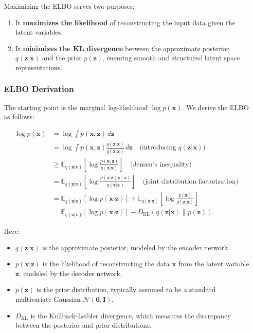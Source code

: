 \documentclass[a4paper,12pt]{article}
\begin{document}
Maximizing the ELBO serves two purposes:
\begin{enumerate}
    \item It \textbf{maximizes the likelihood} of reconstructing the input data given the latent variables.
    \item It \textbf{minimizes the KL divergence} between the approximate posterior $q(\mathbf{z}|\mathbf{x})$ and the prior $p(\mathbf{z})$, ensuring smooth and structured latent space representations.
\end{enumerate}

\subsubsection{ELBO Derivation}
The starting point is the marginal log-likelihood $\log p(\mathbf{x})$. We derive the ELBO as follows:

\begin{align*}
\log p(\mathbf{x}) 
&= \log \int p(\mathbf{x}, \mathbf{z}) \, d\mathbf{z} \\
&= \log \int p(\mathbf{x}, \mathbf{z}) \frac{q(\mathbf{z}|\mathbf{x})}{q(\mathbf{z}|\mathbf{x})} \, d\mathbf{z} \quad \text{(introducing $q(\mathbf{z}|\mathbf{x})$)} \\
&\geq \mathbb{E}_{q(\mathbf{z}|\mathbf{x})} \left[ \log \frac{p(\mathbf{x}, \mathbf{z})}{q(\mathbf{z}|\mathbf{x})} \right] \quad \text{(Jensen's inequality)} \\
&= \mathbb{E}_{q(\mathbf{z}|\mathbf{x})} \left[ \log \frac{p(\mathbf{x}|\mathbf{z}) p(\mathbf{z})}{q(\mathbf{z}|\mathbf{x})} \right] \quad \text{(joint distribution factorization)} \\
&= \mathbb{E}_{q(\mathbf{z}|\mathbf{x})} \left[ \log p(\mathbf{x}|\mathbf{z}) \right] 
+ \mathbb{E}_{q(\mathbf{z}|\mathbf{x})} \left[ \log \frac{p(\mathbf{z})}{q(\mathbf{z}|\mathbf{x})} \right] \\
&= \mathbb{E}_{q(\mathbf{z}|\mathbf{x})} \left[ \log p(\mathbf{x}|\mathbf{z}) \right] 
- D_{\text{KL}} \left( q(\mathbf{z}|\mathbf{x}) \| p(\mathbf{z}) \right).
\end{align*}

Here:
\begin{itemize}
    \item $q(\mathbf{z}|\mathbf{x})$ is the approximate posterior, modeled by the encoder network.
    \item $p(\mathbf{x}|\mathbf{z})$ is the likelihood of reconstructing the data $\mathbf{x}$ from the latent variable $\mathbf{z}$, modeled by the decoder network.
    \item $p(\mathbf{z})$ is the prior distribution, typically assumed to be a standard multivariate Gaussian $\mathcal{N}(\mathbf{0}, \mathbf{I})$.
    \item $D_{\text{KL}}$ is the Kullback-Leibler divergence, which measures the discrepancy between the posterior and prior distributions.
\end{itemize}
\end{document}
